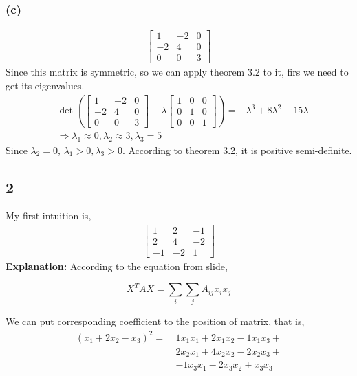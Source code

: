 \documentclass{article}
\def\implies{\Longrightarrow}
\begin{document}
\subsubsection*{(c)}
\[
\begin{split}
\begin{bmatrix} 1 & -2 & 0 \\ -2 & 4 & 0 \\ 0 & 0 & 3\end{bmatrix}
\end{split}
\]
Since this matrix is symmetric, so we can apply theorem 3.2 to it, firs we need to get its eigenvalues.
\[
\begin{split}
& \det(\begin{bmatrix} 1 & -2 & 0 \\ -2 & 4 & 0 \\ 0 & 0 & 3\end{bmatrix} - \lambda \begin{bmatrix} 1 & 0 & 0 \\ 0 & 1 & 0 \\ 0 & 0 & 1\end{bmatrix}) = -\lambda^3+8\lambda^2-15\lambda \\ & \implies \lambda_1 \approx 0 , \lambda_2 \approx 3, \lambda_3 = 5 
\end{split}
\]
Since $\lambda_2 = 0$, $\lambda_1 > 0 , \lambda_3 > 0$. According to theorem 3.2, it is positive semi-definite.
\subsection*{2}
My first intuition is,
\[
\begin{split}
\begin{bmatrix} 1 & 2 & -1 \\ 2 & 4 & -2 \\ -1 & -2 & 1\end{bmatrix} 
\end{split}
\]
\textbf{Explanation:} According to the equation from slide,

$$X^TAX = \sum \limits_{i} \sum \limits_{j} A_{ij}x_ix_j$$

We can put corresponding coefficient to the position of matrix, that is,
\[
\begin{split}
(x_1 + 2x_2 - x_3)^2 = \ &1x_1x_1+2x_1x_2-1x_1x_3+ \\ 
                            &2x_2x_1 +4x_2x_2-2x_2x_3+ \\
                            &-1x_3x_1-2x_3x_2+x_3x_3
\end{split}
\]
\end{document}
